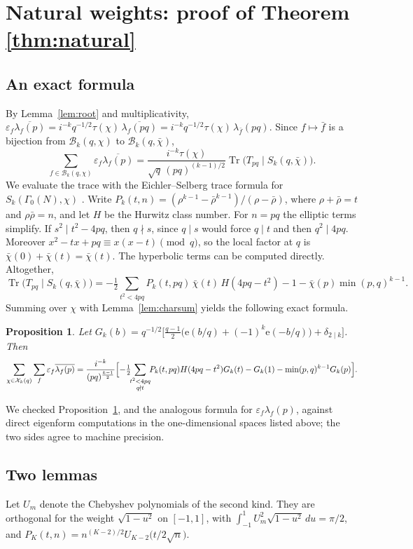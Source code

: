 \documentclass[11pt]{amsart}
\newtheorem{proposition}[theorem]{Proposition}
\theoremstyle{remark}
\newcommand{\eps}{\varepsilon}
\newcommand{\e}{\mathrm{e}}
\newcommand{\cX}{\mathcal{X}}
\newcommand{\cB}{\mathcal{B}}
\newcommand{\ov}{\overline}
\newcommand{\Tr}{\operatorname{Tr}}
\begin{document}
\section{Natural weights: proof of Theorem \ref{thm:natural}}\label{sec:natural}

\subsection{An exact formula}
By Lemma~\ref{lem:root} and multiplicativity, $\eps_f\ov{\lambda_f(p)}=i^{-k}q^{-1/2}\tau(\chi)\,\ov{\lambda_f(pq)}=i^{-k}q^{-1/2}\tau(\chi)\,\lambda_{\bar f}(pq)$. Since $f\mapsto\bar f$ is a bijection from $\cB_k(q,\chi)$ to $\cB_k(q,\bar\chi)$,
\[
\sum_{f\in\cB_k(q,\chi)}\eps_f\ov{\lambda_f(p)}=\frac{i^{-k}\tau(\chi)}{\sqrt q\,(pq)^{(k-1)/2}}\Tr\bigl(T_{pq}\mid S_k(q,\bar\chi)\bigr).
\]
We evaluate the trace with the Eichler--Selberg trace formula for $S_k(\Gamma_0(N),\chi)$ \cite[Thm.~12.4.11]{CS}. Write $P_k(t,n)=(\rho^{k-1}-\bar\rho^{k-1})/(\rho-\bar\rho)$, where $\rho+\bar\rho=t$ and $\rho\bar\rho=n$, and let $H$ be the Hurwitz class number. For $n=pq$ the elliptic terms simplify. If $s^2\mid t^2-4pq$, then $q\nmid s$, since $q\mid s$ would force $q\mid t$ and then $q^2\mid4pq$. Moreover $x^2-tx+pq\equiv x(x-t)\pmod q$, so the local factor at $q$ is $\bar\chi(0)+\bar\chi(t)=\bar\chi(t)$. The hyperbolic terms can be computed directly. Altogether,
\[
\Tr\bigl(T_{pq}\mid S_k(q,\bar\chi)\bigr)=-\tfrac12\sum_{t^2<4pq}P_k(t,pq)\,\bar\chi(t)\,H(4pq-t^2)-1-\bar\chi(p)\min(p,q)^{k-1}.
\]
Summing over $\chi$ with Lemma~\ref{lem:charsum} yields the following exact formula.

\begin{proposition}\label{prop:exact}
Let $G_k(b)=q^{-1/2}\bigl[\frac{q-1}{2}\bigl(\e(b/q)+(-1)^k\e(-b/q)\bigr)+\delta_{2\mid k}\bigr]$. Then
\[
\sum_{\chi\in\cX_k(q)}\sum_f\eps_f\ov{\lambda_f(p)}=\frac{i^{-k}}{(pq)^{\frac{k-1}{2}}}\Bigl[-\tfrac12\!\!\sum_{\substack{t^2<4pq\\ q\nmid t}}\!\!P_k(t,pq)H(4pq-t^2)G_k(t)-G_k(1)-\min(p,q)^{k-1}G_k(p)\Bigr].
\]
\end{proposition}

We checked Proposition~\ref{prop:exact}, and the analogous formula for $\eps_f\lambda_f(p)$, against direct eigenform computations in the one-dimensional spaces listed above; the two sides agree to machine precision.

\subsection{Two lemmas}
Let $U_m$ denote the Chebyshev polynomials of the second kind. They are orthogonal for the weight $\sqrt{1-u^2}$ on $[-1,1]$, with $\int_{-1}^1U_m^2\sqrt{1-u^2}\,du=\pi/2$, and $P_K(t,n)=n^{(K-2)/2}U_{K-2}\bigl(t/2\sqrt n\bigr)$.
\end{document}
